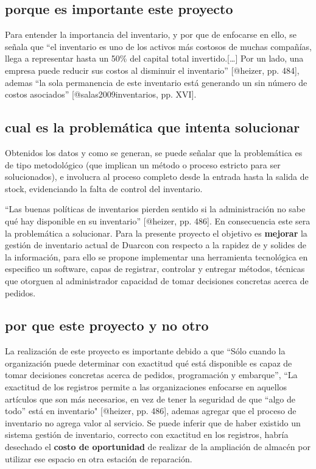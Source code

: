 \documentclass[
]{article}
\begin{document}
\hypertarget{porque-es-importante-este-proyecto}{%
\subsection{porque es importante este
proyecto}\label{porque-es-importante-este-proyecto}}

Para entender la importancia del inventario, y por que de enfocarse en
ello, se señala que ``el inventario es uno de los activos más costosos
de muchas compañías, llega a representar hasta un 50\% del capital total
invertido.{[}\ldots{]} Por un lado, una empresa puede reducir sus costos
al disminuir el inventario'' {[}@heizer, pp. 484{]}, ademas ``la sola
permanencia de este inventario está generando un sin número de costos
asociados'' {[}@salas2009inventarios, pp. XVI{]}.

\hypertarget{cual-es-la-problemuxe1tica-que-intenta-solucionar}{%
\subsection{cual es la problemática que intenta
solucionar}\label{cual-es-la-problemuxe1tica-que-intenta-solucionar}}

Obtenidos los datos y como se generan, se puede señalar que la
problemática es de tipo metodológico (que implican un método o proceso
estricto para ser solucionados), e involucra al proceso completo desde
la entrada hasta la salida de stock, evidenciando la falta de control
del inventario.

``Las buenas políticas de inventarios pierden sentido si la
administración no sabe qué hay disponible en su inventario'' {[}@heizer,
pp. 486{]}. En consecuencia este sera la problemática a solucionar. Para
la presente proyecto el objetivo es \textbf{mejorar} la gestión de
inventario actual de Duarcon con respecto a la rapidez de y solides de
la información, para ello se propone implementar una herramienta
tecnológica en especifico un software, capas de registrar, controlar y
entregar métodos, técnicas que otorguen al administrador capacidad de
tomar decisiones concretas acerca de pedidos.

\hypertarget{por-que-este-proyecto-y-no-otro}{%
\subsection{por que este proyecto y no
otro}\label{por-que-este-proyecto-y-no-otro}}

La realización de este proyecto es importante debido a que ``Sólo cuando
la organización puede determinar con exactitud qué está disponible es
capaz de tomar decisiones concretas acerca de pedidos, programación y
embarque'', ``La exactitud de los registros permite a las organizaciones
enfocarse en aquellos artículos que son más necesarios, en vez de tener
la seguridad de que ``algo de todo'' está en inventario" {[}@heizer, pp.
486{]}, ademas agregar que el proceso de inventario no agrega valor al
servicio. Se puede inferir que de haber existido un sistema gestión de
inventario, correcto con exactitud en los registros, habría desechado el
\textbf{costo de oportunidad} de realizar de la ampliación de almacén
por utilizar ese espacio en otra estación de reparación.
\end{document}
